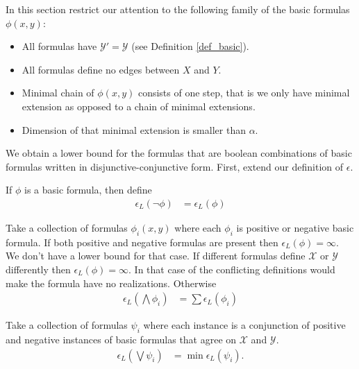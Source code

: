 \documentclass{amsart}
\newcommand{\X}{\mathcal X}
\newcommand{\Y}{\mathcal Y}
\begin{document}
In this section restrict our attention to the following family of the basic formulas $\phi(x,y)$:
\begin{itemize}
\item All formulas have $\Y' = \Y$ (see Definition \ref{def_basic}).
\item All formulas define no edges between $X$ and $Y$.
\item Minimal chain of $\phi(x,y)$ consists of one step, that is we only have minimal extension as opposed to a chain of minimal extensions.
\item Dimension of that minimal extension is smaller than $\alpha$.
\end{itemize}

We obtain a lower bound for the formulas that are boolean combinations of basic formulas written in disjunctive-conjunctive form.
First, extend our definition of $\epsilon$.

\begin{Definition}[Negation]
  If $\phi$ is a basic formula, then define
  \begin{align*}
    \epsilon_L(\neg \phi) &= \epsilon_L(\phi)
  \end{align*}
\end{Definition}

\begin{Definition}[Conjunction]
  Take a collection of formulas $\phi_i(x, y)$ where each $\phi_i$ is positive or negative basic formula.
  If both positive and negative formulas are present then $\epsilon_L(\phi) = \infty$.
  We don't have a lower bound for that case.
  If different formulas define $\X$ or $\Y$ differently then $\epsilon_L(\phi) = \infty$.
  In that case of the conflicting definitions would make the formula have no realizations.
  Otherwise
  \begin{align*}
    \epsilon_L(\bigwedge \phi_i) &= \sum \epsilon_L(\phi_i)
  \end{align*}
\end{Definition}

\begin{Definition} [Disjunction]
  Take a collection of formulas $\psi_i$ where each instance is a conjunction of positive and negative instances of basic formulas that agree on $\X$ and $\Y$.
  \begin{align*}
    \epsilon_L(\bigvee \psi_i) &= \min \epsilon_L(\psi_i).
  \end{align*}
\end{Definition}
\end{document}

